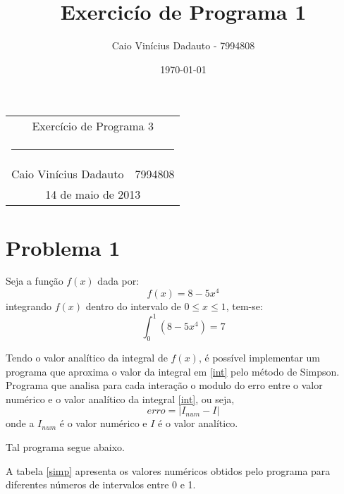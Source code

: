 \documentclass[a4paper,11pt, twoside]{article}
\date{\today}
\author{Caio Vinícius Dadauto - 7994808}
\title{Exercicío de Programa 1}
\begin{document}
    \pagestyle{fancy}
    \fancyhf{}
    \renewcommand{\footrulewidth}{0.1pt}
    \renewcommand{\headrulewidth}{0.0pt}
    \fancyfoot[LE, RO]{\bfseries \thepage}

    \begin{center}
        \begin{tabular}{c}
            {\huge Exercício de Programa 3}\\[-0.5cm]
            \rule{0.6\textwidth}{0.1mm}\\
            Caio Vinícius Dadauto$\quad$7994808\\
            {\small 14 de maio de 2013}
        \end{tabular}
    \end{center}
    \vspace{2cm}

    \section*{Problema 1}
    Seja a função $f(x)$ dada por:
    \begin{equation}
        f(x) = 8 - 5x^4
    \end{equation}
    integrando $f(x)$ dentro do intervalo de $0\le x\le1$, tem-se:
    \begin{equation}\label{int}
        \int^1_0 (8 - 5x^4) = 7
    \end{equation}
    
    Tendo o  valor  analítico da integral de $f(x)$, é possível implementar
    um programa que aproxima o valor da integral em \eqref{int} pelo método de
    Simpson. Programa que analisa para cada interação o modulo do erro entre
    o valor numérico e o valor analítico da integral \eqref{int}, ou seja,
    \begin{equation}
        erro = |I_{num} - I|
    \end{equation}
    onde a $I_{num}$ é o valor numérico e $I$ é o valor analítico.
    
    Tal programa segue abaixo.
    {\linespread{1.15}
    }
    
    A tabela \ref{simp} apresenta os valores numéricos obtidos pelo programa
    para diferentes números de intervalos entre 0 e 1.
    
\end{document}
